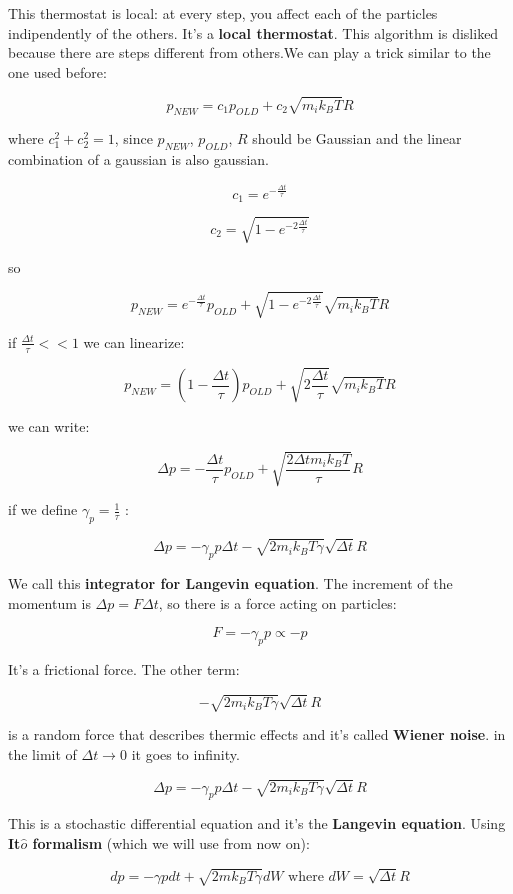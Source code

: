 \documentclass[a4paper, italian, openany]{book}
\begin{document}
This thermostat is local: at every step, you affect each of the particles indipendently of the others. It's a \textbf{local thermostat}.
This algorithm is disliked because there are steps different from others.We can play a trick similar to the one used before:

$$p_{NEW} = c_1 p_{OLD} + c_2 \sqrt{m_i k_B T} R$$

where $c_1^2+c_2^2 = 1$, since $p_{NEW}$, $p_{OLD}$, $R$ should be Gaussian and the linear combination of a gaussian is also gaussian.

$$c_1 = e^{-\frac{\Delta t}{\tau}}$$

$$c_2 = \sqrt{1- e^{-2\frac{\Delta t}{\tau}}}$$

so

$$p_{NEW} = e^{-\frac{\Delta t}{\tau}} p_{OLD} + \sqrt{1- e^{-2\frac{\Delta t}{\tau}}} \sqrt{m_i k_B T} R$$

if $\frac{\Delta t}{\tau} << 1$ we can linearize:

$$p_{NEW} = (1 - \frac{\Delta t}{\tau}) p_{OLD} + \sqrt{2\frac{\Delta t}{\tau}} \sqrt{m_i k_B T} R$$

we can write:

$$\Delta p = -\frac{\Delta t}{\tau} p_{OLD} + \sqrt{\frac{2\Delta t m_i k_B T}{\tau}} R$$

if we define $\gamma_p = \frac{1}{\tau}$ :

$$\Delta p = -\gamma_p p \Delta t - \sqrt{2 m_i k_B T \gamma} \sqrt{\Delta t} R$$

We call this \textbf{integrator for Langevin equation}. The increment of the momentum is $\Delta p = F \Delta t$, so there is a force acting on particles: 

$$F = -\gamma_p p \propto -p$$ 

It's a frictional force. The other term:

$$- \sqrt{2 m_i k_B T \gamma} \sqrt{\Delta t} R$$ 

is a random force that describes thermic effects and it's called \textbf{Wiener noise}. in the limit of $\Delta t \to 0$ it goes to infinity.

$$\Delta p = -\gamma_p p \Delta t - \sqrt{2 m_i k_B T \gamma} \sqrt{\Delta t} R$$

This is a stochastic differential equation and it's the \textbf{Langevin equation}. Using \textbf{It$\hat{o}$ formalism} (which we will use from now on):

$$dp = -\gamma p dt + \sqrt{2 m k_B T \gamma} dW \mbox{ where } dW =  \sqrt{\Delta t} R$$
\end{document}
